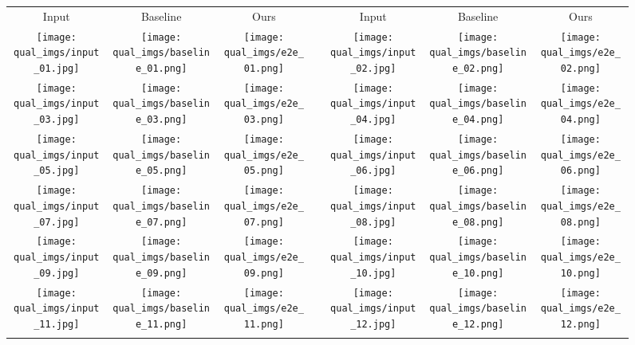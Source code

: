 \documentclass[conference]{IEEEtran}
\begin{document}
\begin{figure*}
\centering
\begin{tabular}{ccccccc}
Input & Baseline & Ours & & Input & Baseline & Ours \\
\texttt{[image: qual\_imgs/input\_01.jpg]} & 
\texttt{[image: qual\_imgs/baseline\_01.png]} & 
\texttt{[image: qual\_imgs/e2e\_01.png]} & 
\hspace{4em} &
\texttt{[image: qual\_imgs/input\_02.jpg]} & 
\texttt{[image: qual\_imgs/baseline\_02.png]} & 
\texttt{[image: qual\_imgs/e2e\_02.png]} \\
\texttt{[image: qual\_imgs/input\_03.jpg]} & 
\texttt{[image: qual\_imgs/baseline\_03.png]} & 
\texttt{[image: qual\_imgs/e2e\_03.png]} & 
\hspace{4em} &
\texttt{[image: qual\_imgs/input\_04.jpg]} & 
\texttt{[image: qual\_imgs/baseline\_04.png]} & 
\texttt{[image: qual\_imgs/e2e\_04.png]} \\
\texttt{[image: qual\_imgs/input\_05.jpg]} & 
\texttt{[image: qual\_imgs/baseline\_05.png]} & 
\texttt{[image: qual\_imgs/e2e\_05.png]} & 
\hspace{4em} &
\texttt{[image: qual\_imgs/input\_06.jpg]} & 
\texttt{[image: qual\_imgs/baseline\_06.png]} & 
\texttt{[image: qual\_imgs/e2e\_06.png]} \\
\texttt{[image: qual\_imgs/input\_07.jpg]} & 
\texttt{[image: qual\_imgs/baseline\_07.png]} & 
\texttt{[image: qual\_imgs/e2e\_07.png]} & 
\hspace{4em} &
\texttt{[image: qual\_imgs/input\_08.jpg]} & 
\texttt{[image: qual\_imgs/baseline\_08.png]} & 
\texttt{[image: qual\_imgs/e2e\_08.png]} \\
\texttt{[image: qual\_imgs/input\_09.jpg]} & 
\texttt{[image: qual\_imgs/baseline\_09.png]} & 
\texttt{[image: qual\_imgs/e2e\_09.png]} & 
\hspace{4em} &
\texttt{[image: qual\_imgs/input\_10.jpg]} & 
\texttt{[image: qual\_imgs/baseline\_10.png]} & 
\texttt{[image: qual\_imgs/e2e\_10.png]} \\
\texttt{[image: qual\_imgs/input\_11.jpg]} & 
\texttt{[image: qual\_imgs/baseline\_11.png]} & 
\texttt{[image: qual\_imgs/e2e\_11.png]} & 
\hspace{4em} &
\texttt{[image: qual\_imgs/input\_12.jpg]} & 
\texttt{[image: qual\_imgs/baseline\_12.png]} & 
\texttt{[image: qual\_imgs/e2e\_12.png]} \\
\\


\end{tabular}
\end{figure*}
\end{document}

